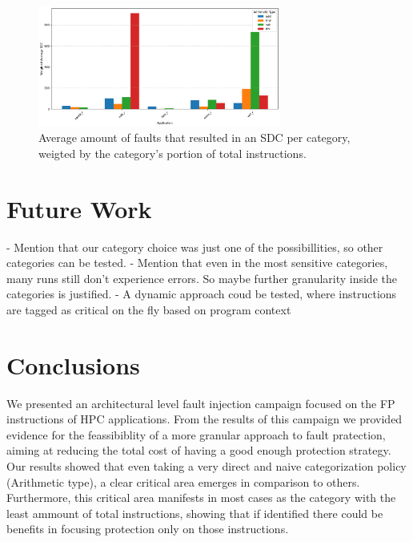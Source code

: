 \documentclass[lettersize,journal]{IEEEtran}
\begin{document}
\begin{figure}[!t] 
    \centering
    \includegraphics[width=8cm]{plots/average_arithmetic/benchmarks_grouped_by_category_weighted.pdf}
\caption{Average amount of faults that resulted in an SDC per category, weigted by the category's portion of total instructions.}
\label{average_weight}
\end{figure}

\section{Future Work}
- Mention that our category choice was just one of the possibillities, so other categories can be tested.
- Mention that even in the most sensitive categories, many runs still don't experience errors. So maybe further granularity inside the categories is justified.
- A dynamic approach coud be tested, where instructions are tagged as critical on the fly based on program context


\section{Conclusions}
We presented an architectural level fault injection campaign focused on the FP instructions of HPC applications. From the results of this campaign we provided evidence for the feassibiblity of a more granular approach to fault pratection, aiming at reducing the total cost of having a good enough protection strategy.\\
Our results showed that even taking a very direct and naive categorization policy (Arithmetic type), a clear critical area emerges in comparison to others. Furthermore, this critical area manifests in most cases as the category with the least ammount of total instructions, showing that if identified there could be benefits in focusing protection only on those instructions.



\end{document}
